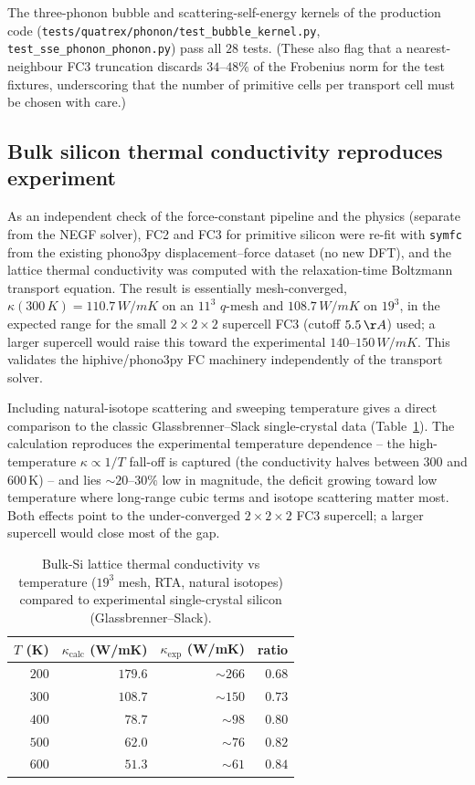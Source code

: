 The three-phonon bubble and scattering-self-energy kernels of the production code
(\texttt{tests/quatrex/phonon/test\_bubble\_kernel.py},
\texttt{test\_sse\_phonon\_phonon.py}) pass all $28$ tests. (These also flag that a
nearest-neighbour FC3 truncation discards $34$--$48\%$ of the Frobenius norm for the
test fixtures, underscoring that the number of primitive cells per transport cell
must be chosen with care.)

\subsection{Bulk silicon thermal conductivity reproduces experiment}
\label{sec:diag_bulk_kappa}

As an independent check of the force-constant pipeline and the physics (separate
from the NEGF solver), FC2 and FC3 for primitive silicon were re-fit with
\texttt{symfc} from the existing phono3py displacement--force dataset (no new DFT),
and the lattice thermal conductivity was computed with the relaxation-time
Boltzmann transport equation. The result is essentially mesh-converged,
$\kappa(300\,K)=110.7\,W/mK$ on an $11^3$ $q$-mesh and $108.7\,W/mK$ on
$19^3$, in the
expected range for the small $2\times2\times2$ supercell FC3 (cutoff
$5.5\,\AA{}$) used; a larger supercell would raise this toward the
experimental $140$--$150\,W/mK$. This validates the hiphive/phono3py FC
machinery independently of the transport solver.

Including natural-isotope scattering and sweeping temperature gives a direct comparison to
the classic Glassbrenner--Slack single-crystal data (Table~\ref{tab:diag_kappaT}). The
calculation reproduces the experimental temperature dependence -- the high-temperature
$\kappa\propto1/T$ fall-off is captured (the conductivity halves between $300$ and
$600\,\mathrm{K}$) -- and lies $\sim20$--$30\%$ low in magnitude, the deficit growing toward
low temperature where long-range cubic terms and isotope scattering matter most. Both effects
point to the under-converged $2\times2\times2$ FC3 supercell; a larger supercell would close
most of the gap.

\begin{table}[t]
  \centering
  \caption{Bulk-Si lattice thermal conductivity vs temperature ($19^3$ mesh, RTA, natural
    isotopes) compared to experimental single-crystal silicon (Glassbrenner--Slack).}
  \label{tab:diag_kappaT}
  \begin{tabular}{rrrr}
    \toprule
    $T$ (K) & $\kappa_\text{calc}$ (W/mK) & $\kappa_\text{exp}$ (W/mK) & ratio\\
    \midrule
    $200$ & $179.6$ & ${\sim}266$ & $0.68$\\
    $300$ & $108.7$ & ${\sim}150$ & $0.73$\\
    $400$ & $78.7$  & ${\sim}98$  & $0.80$\\
    $500$ & $62.0$  & ${\sim}76$  & $0.82$\\
    $600$ & $51.3$  & ${\sim}61$  & $0.84$\\
    \bottomrule
  \end{tabular}
\end{table}

